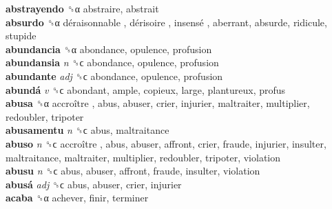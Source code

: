 \textbf{abstrayendo} ␝α  abstraire, abstrait  \\
\textbf{absurdo} ␝α   déraisonnable ,  dérisoire ,  insensé , aberrant, absurde, ridicule, stupide  \\
\textbf{abundancia} ␝α  abondance, opulence, profusion  \\
\textbf{abundansia} \emph{n}  ␝ϲ  abondance, opulence, profusion  \\
\textbf{abundante} \emph{adj}  ␝ϲ  abondance, opulence, profusion  \\
\textbf{abundá} \emph{v}  ␝ϲ  abondant, ample, copieux, large, plantureux, profus  \\
\textbf{abusa} ␝α   accroître , abus, abuser, crier, injurier, maltraiter, multiplier, redoubler, tripoter  \\
\textbf{abusamentu} \emph{n}  ␝ϲ  abus, maltraitance  \\
\textbf{abuso} \emph{n}  ␝ϲ   accroître , abus, abuser, affront, crier, fraude, injurier, insulter, maltraitance, maltraiter, multiplier, redoubler, tripoter, violation  \\
\textbf{abusu} \emph{n}  ␝ϲ  abus, abuser, affront, fraude, insulter, violation  \\
\textbf{abusá} \emph{adj}  ␝ϲ  abus, abuser, crier, injurier  \\
\textbf{acaba} ␝α  achever, finir, terminer  \\
